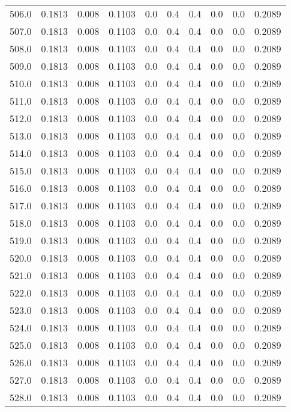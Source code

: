 \begin{longtable}{lrrrrrrrrr}
506.0 & 0.1813 & 0.008 & 0.1103 & 0.0 & 0.4 & 0.4 & 0.0 & 0.0 & 0.2089 \\
507.0 & 0.1813 & 0.008 & 0.1103 & 0.0 & 0.4 & 0.4 & 0.0 & 0.0 & 0.2089 \\
508.0 & 0.1813 & 0.008 & 0.1103 & 0.0 & 0.4 & 0.4 & 0.0 & 0.0 & 0.2089 \\
509.0 & 0.1813 & 0.008 & 0.1103 & 0.0 & 0.4 & 0.4 & 0.0 & 0.0 & 0.2089 \\
510.0 & 0.1813 & 0.008 & 0.1103 & 0.0 & 0.4 & 0.4 & 0.0 & 0.0 & 0.2089 \\
511.0 & 0.1813 & 0.008 & 0.1103 & 0.0 & 0.4 & 0.4 & 0.0 & 0.0 & 0.2089 \\
512.0 & 0.1813 & 0.008 & 0.1103 & 0.0 & 0.4 & 0.4 & 0.0 & 0.0 & 0.2089 \\
513.0 & 0.1813 & 0.008 & 0.1103 & 0.0 & 0.4 & 0.4 & 0.0 & 0.0 & 0.2089 \\
514.0 & 0.1813 & 0.008 & 0.1103 & 0.0 & 0.4 & 0.4 & 0.0 & 0.0 & 0.2089 \\
515.0 & 0.1813 & 0.008 & 0.1103 & 0.0 & 0.4 & 0.4 & 0.0 & 0.0 & 0.2089 \\
516.0 & 0.1813 & 0.008 & 0.1103 & 0.0 & 0.4 & 0.4 & 0.0 & 0.0 & 0.2089 \\
517.0 & 0.1813 & 0.008 & 0.1103 & 0.0 & 0.4 & 0.4 & 0.0 & 0.0 & 0.2089 \\
518.0 & 0.1813 & 0.008 & 0.1103 & 0.0 & 0.4 & 0.4 & 0.0 & 0.0 & 0.2089 \\
519.0 & 0.1813 & 0.008 & 0.1103 & 0.0 & 0.4 & 0.4 & 0.0 & 0.0 & 0.2089 \\
520.0 & 0.1813 & 0.008 & 0.1103 & 0.0 & 0.4 & 0.4 & 0.0 & 0.0 & 0.2089 \\
521.0 & 0.1813 & 0.008 & 0.1103 & 0.0 & 0.4 & 0.4 & 0.0 & 0.0 & 0.2089 \\
522.0 & 0.1813 & 0.008 & 0.1103 & 0.0 & 0.4 & 0.4 & 0.0 & 0.0 & 0.2089 \\
523.0 & 0.1813 & 0.008 & 0.1103 & 0.0 & 0.4 & 0.4 & 0.0 & 0.0 & 0.2089 \\
524.0 & 0.1813 & 0.008 & 0.1103 & 0.0 & 0.4 & 0.4 & 0.0 & 0.0 & 0.2089 \\
525.0 & 0.1813 & 0.008 & 0.1103 & 0.0 & 0.4 & 0.4 & 0.0 & 0.0 & 0.2089 \\
526.0 & 0.1813 & 0.008 & 0.1103 & 0.0 & 0.4 & 0.4 & 0.0 & 0.0 & 0.2089 \\
527.0 & 0.1813 & 0.008 & 0.1103 & 0.0 & 0.4 & 0.4 & 0.0 & 0.0 & 0.2089 \\
528.0 & 0.1813 & 0.008 & 0.1103 & 0.0 & 0.4 & 0.4 & 0.0 & 0.0 & 0.2089 \\

\end{longtable}
